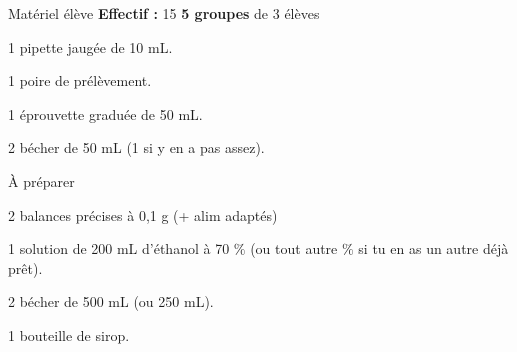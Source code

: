 
\begin{boiteMateriel}{Matériel élève}
  \textbf{Effectif :} 15
  \qq{}\qq{}
  \flecheLongue \textbf{5 groupes} de 3 élèves

  \begin{protocole}[2]
    \item 1 pipette jaugée de 10 mL.
    \item 1 poire de prélèvement.
    \item 1 éprouvette graduée de 50 mL.
    \item 2 bécher de 50 mL (1 si y en a pas assez).
  \end{protocole}
\end{boiteMateriel}


\begin{boiteMateriel}{À préparer}
  \begin{protocole}
    \item 2 balances précises à 0,1 g (+ alim adaptés)
    \item 1 solution de 200 mL d'éthanol à 70 $\%$ (ou tout autre $\%$ si tu en as un autre déjà prêt).
    \item 2 bécher de 500 mL (ou 250 mL).
    \item 1 bouteille de sirop.
  \end{protocole}
\end{boiteMateriel}